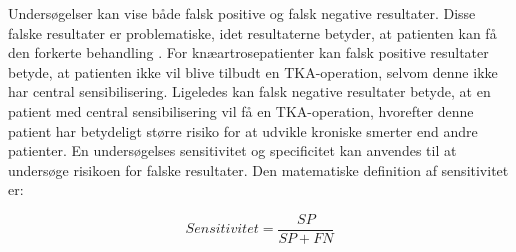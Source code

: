 
Undersøgelser kan vise både falsk positive og falsk negative resultater. Disse falske resultater er problematiske, idet resultaterne betyder, at patienten kan få den forkerte behandling \citep{Lalkhen2008}. For knæartrosepatienter kan falsk positive resultater betyde, at patienten ikke vil blive tilbudt en TKA-operation, selvom denne ikke har central sensibilisering. Ligeledes kan falsk negative resultater betyde, at en patient med central sensibilisering vil få en TKA-operation, hvorefter denne patient har betydeligt større risiko for at udvikle kroniske smerter end andre patienter. En undersøgelses sensitivitet og specificitet kan anvendes til at undersøge risikoen for falske resultater. Den matematiske definition af sensitivitet er:
\vspace{-0.50cm}
\begin{center}
	\begin{equation}
	Sensitivitet=\frac{SP}{SP+FN}
	\end{equation}
\end{center}


